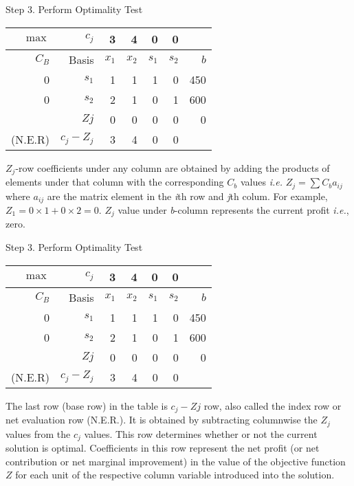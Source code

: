 \begin{frame}{Step 3. Perform Optimality Test}{}
  {\centering
    \begin{tabular}{rrrrrrr}
      \toprule
      $\max$& $c_j$  &3 &4 &0 &0 & \\
      \midrule
      $C_B$ &Basis&$x_1$&$x_2$&$s_1$&$s_2$&$b$\\
      \midrule
      0&$s_1$&1&1&1&0&450\\
      0&$s_2$&2&1&0&1&600\\
      \midrule
      &$Zj$&\cellcolor{cyan!30}0&\cellcolor{cyan!30}0&\cellcolor{cyan!30}0&\cellcolor{cyan!30}0&0\\
      (N.E.R)&$c_j - Z_j$&3&4&0&0&\\
      \bottomrule
    \end{tabular}
    \par}

  $Z_j$-row coefficients under any column are obtained by adding the products of elements under that column with the corresponding $C_b$ values \emph{i.e.} $Z_j = \sum C_b a_{ij}$ where $a_{ij}$ are the matrix element in the \emph{i}th row and \emph{j}th colum. For example, $Z_1 = 0 \times 1 + 0 \times 2 = 0$. \alert{$Z_j$ value under \emph{b}-column represents the current profit \emph{i.e.}, zero}.
\end{frame}


\begin{frame}{Step 3. Perform Optimality Test}{}
  {\centering
    \begin{tabular}{rrrrrrr}
      \toprule
      $\max$& $c_j$  &3 &4 &0 &0 & \\
      \midrule
      $C_B$ &Basis&$x_1$&$x_2$&$s_1$&$s_2$&$b$\\
      \midrule
      0&$s_1$&1&1&1&0&450\\
      0&$s_2$&2&1&0&1&600\\
      \midrule
      &$Zj$&0&0&0&0&0\\
      (N.E.R)&$c_j - Z_j$&\cellcolor{blue!30}3&\cellcolor{blue!30}4&\cellcolor{blue!30}0&\cellcolor{blue!30}0&\\
      \bottomrule
    \end{tabular}
    \par}

  The last row (base row) in the table is $c_j - Zj$ row, also called the index row or net evaluation row (N.E.R.). It is obtained by \alert{subtracting columnwise the $Z_j$ values from the $c_j$ values. This row determines whether or not the current solution is optimal}. Coefficients in this row represent the net profit (or net contribution or net marginal improvement) in the value of the objective function $Z$ for each unit of the respective column variable introduced into the solution.
\end{frame}

